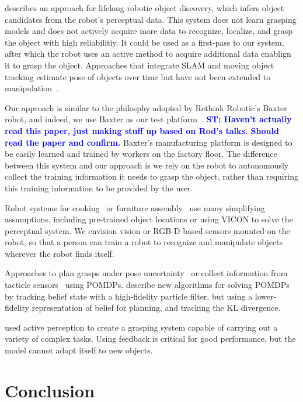 \documentclass[conference]{IEEEtran}
\newcommand{\stnote}[1]{\textcolor{blue}{\textbf{ST: #1}}}
\begin{document}
\citet{collect14} describes an approach for lifelong robotic object
discovery, which infers object candidates from the robot's perceptual
data.  This system does not learn grasping models and does not
actively acquire more data to recognize, localize, and grasp the
object with high reliabilitiy.  It could be used as a first-pass to
our system, after which the robot uses an active method to acquire
additional data enablign it to grasp the object.  Approaches that
integrate SLAM and moving object tracking estimate pose of objects
over time but have not been extended to manipulation~\citep{wang07,
  gallagher09, salas-moreno13, selvatici08}.

Our approach is similar to the philosphy adopted by Rethink Robotic's
Baxter robot, and indeed, we use Baxter as our test
platform~\citep{fitzgerald13}.  \stnote{Haven't actually read this
  paper, just making stuff up based on Rod's talks.  Should read the
  paper and confirm.}  Baxter's manufacturing platform is designed to
be easily learned and trained by workers on the factory floor.  The
difference between this system and our approach is we rely on the
robot to autonomously collect the training information it needs to
grasp the object, rather than requiring this training information to
be provided by the user.


Robot systems for cooking~\citep{bollini12, beetz11} or furniture
assembly~\citep{knepper13} use many simplifying assumptions, including
pre-trained object locations or using VICON to solve the perceptual
system.  We envision vision or RGB-D based sensors mounted on the
robot, so that a person can train a robot to recognize and manipulate
objects wherever the robot finds itself.

Approaches to plan grasps under pose uncertainty~\citep{stulp11} or
collect information from tacticle sensors~\citep{hsiao10} using
POMDPs.  \citet{plat11} describe new algorithms for solving POMDPs by
tracking belief state with a high-fidelity particle filter, but using
a lower-fidelity representation of belief for planning, and tracking
the KL divergence.

\citet{hudson12} used active perception to create a grasping system
capable of carrying out a variety of complex tasks.  Using feedback is
critical for good performance, but the model cannot adapt itself to
new objects.



\section{Conclusion}
\end{document}
